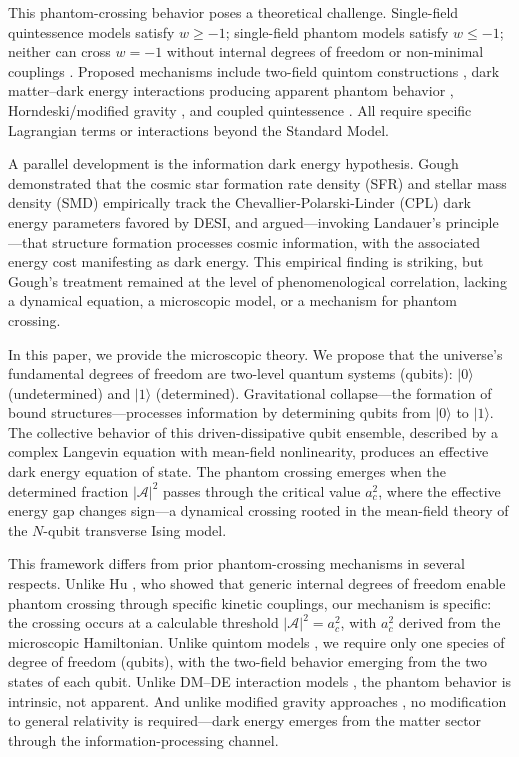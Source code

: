 \documentclass[aps,prd,twocolumn,superscriptaddress]{revtex4-2}
\begin{document}
This phantom-crossing behavior poses a theoretical challenge. Single-field quintessence models satisfy $w \ge -1$; single-field phantom models satisfy $w \le -1$; neither can cross $w=-1$ without internal degrees of freedom \cite{Hu:2005} or non-minimal couplings \cite{Linder:2024}. Proposed mechanisms include two-field quintom constructions \cite{Feng:2005}, dark matter--dark energy interactions producing apparent phantom behavior \cite{Khoury:2025,Guedezounme:2026}, Horndeski/modified gravity \cite{Linder:2025,Cataneo:2025}, and coupled quintessence \cite{Andriot:2025,Chen:2026}. All require specific Lagrangian terms or interactions beyond the Standard Model.

A parallel development is the information dark energy hypothesis. Gough \cite{Gough:2025} demonstrated that the cosmic star formation rate density (SFR) and stellar mass density (SMD) empirically track the Chevallier-Polarski-Linder (CPL) dark energy parameters favored by DESI, and argued---invoking Landauer's principle \cite{Landauer:1961}---that structure formation processes cosmic information, with the associated energy cost manifesting as dark energy. This empirical finding is striking, but Gough's treatment remained at the level of phenomenological correlation, lacking a dynamical equation, a microscopic model, or a mechanism for phantom crossing.

In this paper, we provide the microscopic theory. We propose that the universe's fundamental degrees of freedom are two-level quantum systems (qubits): $|0\rangle$ (undetermined) and $|1\rangle$ (determined). Gravitational collapse---the formation of bound structures---processes information by determining qubits from $|0\rangle$ to $|1\rangle$. The collective behavior of this driven-dissipative qubit ensemble, described by a complex Langevin equation with mean-field nonlinearity, produces an effective dark energy equation of state. The phantom crossing emerges when the determined fraction $|\mathcal{A}|^2$ passes through the critical value $a_c^2$, where the effective energy gap changes sign---a dynamical crossing rooted in the mean-field theory of the $N$-qubit transverse Ising model.

This framework differs from prior phantom-crossing mechanisms in several respects. Unlike Hu \cite{Hu:2005}, who showed that generic internal degrees of freedom enable phantom crossing through specific kinetic couplings, our mechanism is specific: the crossing occurs at a calculable threshold $|\mathcal{A}|^2 = a_c^2$, with $a_c^2$ derived from the microscopic Hamiltonian. Unlike quintom models \cite{Feng:2005}, we require only one species of degree of freedom (qubits), with the two-field behavior emerging from the two states of each qubit. Unlike DM--DE interaction models \cite{Khoury:2025}, the phantom behavior is intrinsic, not apparent. And unlike modified gravity approaches \cite{Linder:2025}, no modification to general relativity is required---dark energy emerges from the matter sector through the information-processing channel.
\end{document}
